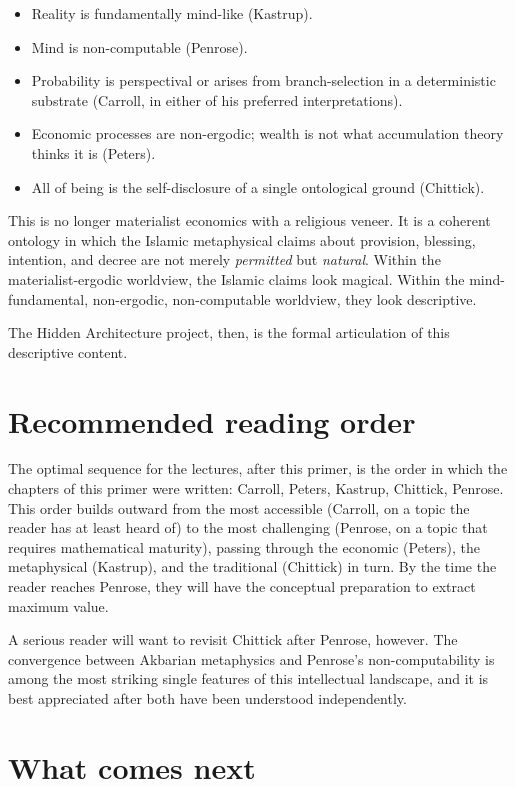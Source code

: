 \documentclass[11pt,a4paper]{book}
\theoremstyle{cleanrm}
\begin{document}
\begin{itemize}[leftmargin=2em]
    \item Reality is fundamentally mind-like (Kastrup).
    \item Mind is non-computable (Penrose).
    \item Probability is perspectival or arises from branch-selection
    in a deterministic substrate (Carroll, in either of his preferred
    interpretations).
    \item Economic processes are non-ergodic; wealth is not what
    accumulation theory thinks it is (Peters).
    \item All of being is the self-disclosure of a single ontological
    ground (Chittick).
\end{itemize}

This is no longer materialist economics with a religious veneer. It
is a coherent ontology in which the Islamic metaphysical claims about
provision, blessing, intention, and decree are not merely
\emph{permitted} but \emph{natural}. Within the materialist-ergodic
worldview, the Islamic claims look magical. Within the
mind-fundamental, non-ergodic, non-computable worldview, they look
descriptive.

The Hidden Architecture project, then, is the formal articulation
of this descriptive content.

\section{Recommended reading order}

The optimal sequence for the lectures, after this primer, is the
order in which the chapters of this primer were written: Carroll,
Peters, Kastrup, Chittick, Penrose. This order builds outward from
the most accessible (Carroll, on a topic the reader has at least
heard of) to the most challenging (Penrose, on a topic that requires
mathematical maturity), passing through the economic (Peters), the
metaphysical (Kastrup), and the traditional (Chittick) in turn. By
the time the reader reaches Penrose, they will have the conceptual
preparation to extract maximum value.

A serious reader will want to revisit Chittick after Penrose, however.
The convergence between Akbarian metaphysics and Penrose's
non-computability is among the most striking single features of this
intellectual landscape, and it is best appreciated after both have
been understood independently.

\section{What comes next}
\end{document}
